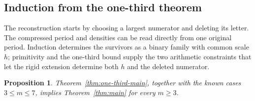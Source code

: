 \documentclass[11pt]{article}
\newtheorem{proposition}[theorem]{Proposition}
\theoremstyle{definition}
\theoremstyle{remark}
\begin{document}
\subsection{Induction from the one-third theorem}

The reconstruction starts by choosing a largest numerator and deleting
its letter.  The compressed period and densities can be read directly from
one original period.  Induction determines the survivors as a binary family
with common scale \(h\); primitivity and the one-third bound supply the two
arithmetic constraints that let the rigid extension determine both \(h\)
and the deleted numerator.

\begin{proposition}\label{prop:one-third-induction}
Theorem~\ref{thm:one-third-main}, together with the known cases
\(3\le m\le7\), implies Theorem~\ref{thm:main} for every \(m\ge3\).
\end{proposition}
\end{document}
